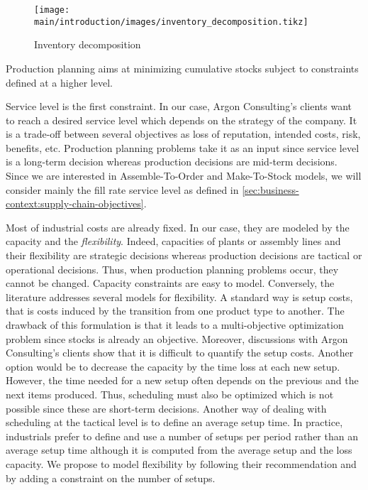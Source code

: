 \begin{figure}[h]
  \centering
  \texttt{[image: main/introduction/images/inventory\_decomposition.tikz]}
  \caption{Inventory decomposition}
  \label{fig:inventory-decomposition}
\end{figure}


\medskip


Production planning aims at minimizing cumulative stocks subject to constraints defined at a higher level.


Service level is the first constraint.
In our case, Argon Consulting's clients want to reach a desired service level which depends on the strategy of the company.
It is a trade-off between several objectives as loss of reputation, intended costs, risk, benefits, etc.
Production planning problems take it as an input since service level is a long-term decision whereas production decisions are mid-term decisions.
Since we are interested in Assemble-To-Order and Make-To-Stock models, we will consider mainly the fill rate service level as defined in \cref{sec:business-context:supply-chain-objectives}.


Most of industrial costs are already fixed.
In our case, they are modeled by the capacity and the \emph{flexibility}.
Indeed, capacities of plants or assembly lines and their flexibility are strategic decisions whereas production decisions are tactical or operational decisions.
Thus, when production planning problems occur, they cannot be changed.
Capacity constraints are easy to model.
Conversely, the literature addresses several models for flexibility.
A standard way is setup costs, that is costs induced by the transition from one product type to another.
The drawback of this formulation is that it leads to a multi-objective optimization problem since stocks is already an objective.
Moreover, discussions with Argon Consulting's clients show that it is difficult to quantify the setup costs.
Another option would be to decrease the capacity by the time loss at each new setup.
However, the time needed for a new setup often depends on the previous and the next items produced.
Thus, scheduling must also be optimized which is not possible since these are short-term decisions.
Another way of dealing with scheduling at the tactical level is to define an average setup time.
In practice, industrials prefer to define and use a number of setups per period rather than an average setup time although it is computed from the average setup and the loss capacity.
We propose to model flexibility by following their recommendation and by adding a constraint on the number of setups.


